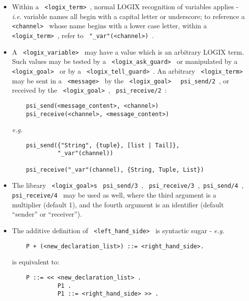\begin{itemize}
\item
Within a \verb+ <logix_term> +, normal LOGIX recognition of variables
applies - {\em i.e.} variable names all begin with a capital letter
or underscore; to reference a \verb+ <channel> + whose name begins
with a lower case letter, within a \verb+ <logix_term> +, refer to
\verb+ "_var"(<channel>) +.


\item
A \verb+ <logix_variable> + may have a value which is an arbitrary LOGIX
term.
Such values may be tested by a \verb+ <logix_ask_guard> + or manipulated
by a \verb+ <logix_goal> + or by a \verb+ <logix_tell_guard> +.  An
arbitrary  \verb+ <logix_term> + may be sent in a \verb+ <message> + by
the \verb+ <logix_goal> + \verb+ psi_send/2 +, or received by the
\verb+ <logix_goal> +, \verb+ psi_receive/2 +:

\begin{verbatim}
    psi_send(<message_content>, <channel>)
    psi_receive(<channel>, <message_content>)
\end{verbatim}

\newpage
\noindent
{\em e.g.}

\begin{verbatim}
    psi_send({"String", {tuple}, [list | Tail]},
             "_var"(channel))

    psi_receive("_var"(channel), {String, Tuple, List})
\end{verbatim}

\item
The library \verb+ <logix_goal>s+ \verb+ psi_send/3 +,
\verb+ psi_receive/3 +,\linebreak \verb+ psi_send/4 +, \verb+ psi_receive/4 + may be
used as well, where the third argument is a multiplier (default 1), and
the fourth argument is an identifier (default ``sender'' or ``receiver'').

\item
The additive definition of \verb+ <left_hand_side> + is syntactic sugar
- {\em e.g.}

\begin{verbatim}
    P + (<new_declaration_list>) ::= <right_hand_side>.
\end{verbatim}

\noindent
is equivalent to:

\begin{verbatim}
    P ::= << <new_declaration_list> .
             P1 .
             P1 ::= <right_hand_side> >> .
\end{verbatim}


\end{itemize}
